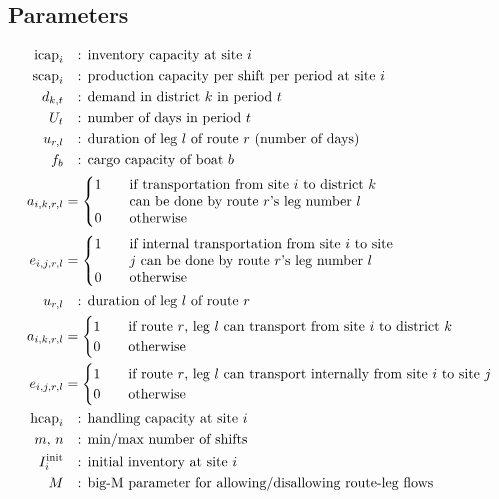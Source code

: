 \documentclass[10pt]{article}
\begin{document}
\subsection{Parameters}
\begin{align}
    \text{icap}_i& \quad\text{: inventory capacity at site $i $}\\
    \text{scap}_i & \quad\text{: production capacity per shift per period at site $i $}\\
    d_{k, t}& \quad\text{: demand in district $k $ in period $t $}\\
    U_t & \quad\text{: number of days in period $t $}\\
    u_{r, l} & \quad\text{: duration of leg $l $ of route $r $ (number of days)}\\
    f_b & \quad\text{: cargo capacity of boat $b $}\\
    a_{i, k, r, l} &=
    \begin{cases}
        1 & \quad\parbox[t]{0.55\linewidth}{if transportation from site $i$ to district $k$\\
            can be done by route $r$'s leg number $l$}\\[1ex]
        0 & \quad\text{otherwise}
    \end{cases}\\
    e_{i, j, r, l} &=
    \begin{cases}
        1 & \quad\parbox[t]{0.55\linewidth}{if internal transportation from site $i $ to site\\
            $j $ can be done by route $r $'s leg number $l $}\\[1ex]
        0 & \quad\text{otherwise}
    \end{cases}\\
    u_{r, l}& \quad\text{: duration of leg $l $ of route $r $}\\
    a_{i, k, r, l}&=
    \begin{cases}
        1 & \quad\text{if route $r $, leg $l $ can transport from site $i $ to district $k $}\\
        0 & \quad\text{otherwise}
    \end{cases}\\
    e_{i, j, r, l}&=
    \begin{cases}
        1 & \quad\text{if route $r $, leg $l $ can transport internally from site $i $ to site $j $}\\
        0 & \quad\text{otherwise}
    \end{cases}\\
    \text{hcap}_i & \quad\text{: handling capacity at site $i $}\\
    m,\, n & \quad\text{: min/max number of shifts}\\
    I_i^\text{init}& \quad\text{: initial inventory at site $i $}\\
    M& \quad\text{: big-M parameter for allowing/disallowing route-leg flows}
\end{align}
\newpage 
\end{document}
